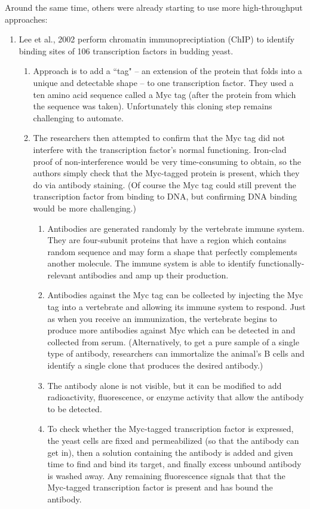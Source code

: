 \documentclass{article}
\begin{document}
Around the same time, others were already starting to use more high-throughput approaches:
\begin{enumerate}
\item Lee et al., 2002 perform chromatin immunopreciptiation (ChIP) to identify binding sites of 106 transcription factors in budding yeast.
\begin{enumerate}
\item Approach is to add a ``tag" -- an extension of the protein that folds into a unique and detectable shape -- to one transcription factor. They used a ten amino acid sequence called a Myc tag (after the protein from which the sequence was taken). Unfortunately this cloning step remains challenging to automate.
\item The researchers then attempted to confirm that the Myc tag did not interfere with the transcription factor's normal functioning. Iron-clad proof of non-interference would be very time-consuming to obtain, so the authors simply check that the Myc-tagged protein is present, which they do via antibody staining. (Of course the Myc tag could still prevent the transcription factor from binding to DNA, but confirming DNA binding would be more challenging.)
\begin{enumerate}
\item Antibodies are generated randomly by the vertebrate immune system. They are four-subunit proteins that have a region which contains random sequence and may form a shape that perfectly complements another molecule. The immune system is able to identify functionally-relevant antibodies and amp up their production.
\item Antibodies against the Myc tag can be collected by injecting the Myc tag into a vertebrate and allowing its immune system to respond. Just as when you receive an immunization, the vertebrate begins to produce more antibodies against Myc which can be detected in and collected from serum. (Alternatively, to get a pure sample of a single type of antibody, researchers can immortalize the animal's B cells and identify a single clone that produces the desired antibody.)
\item The antibody alone is not visible, but it can be modified to add radioactivity, fluorescence, or enzyme activity that allow the antibody to be detected.
\item To check whether the Myc-tagged transcription factor is expressed, the yeast cells are fixed and permeabilized (so that the antibody can get in), then a solution containing the antibody is added and given time to find and bind its target, and finally excess unbound antibody is washed away. Any remaining fluorescence signals that that the Myc-tagged transcription factor is present and has bound the antibody.

\end{enumerate}
\end{enumerate}
\end{enumerate}
\end{document}
